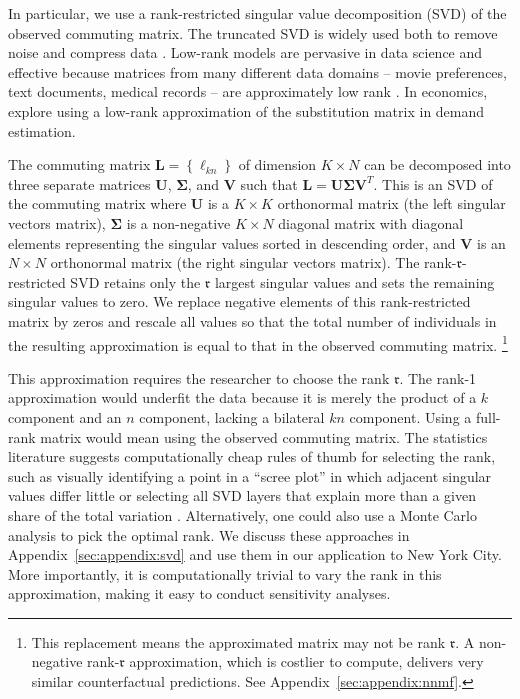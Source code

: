 \documentclass[11pt]{article}
\theoremstyle{definition}
\begin{document}
In particular,
we use a rank-restricted singular value decomposition (SVD) of the observed commuting matrix.
The truncated SVD is widely used both to remove noise and compress data \citep[Ch. 6]{Elden:2007}.
Low-rank models are pervasive in data science and effective because matrices from many different data domains -- movie preferences, text documents, medical records -- are approximately low rank \citep{UdellTownsend:2019}.
In economics, \cite{ConlonMortimerSarkis:2023} explore using a low-rank approximation of the substitution matrix in demand estimation.

The commuting matrix $\mathbf{L}=\left\{\ell_{kn}\right\}$ of dimension $K\times N$ can be decomposed into
three separate matrices $\mathbf{U}$, $\mathbf{\Sigma}$, and $\mathbf{V}$ such that
$\mathbf{L}=\mathbf{U}\mathbf{\Sigma}\mathbf{V}^{T}$.
This is an SVD of the commuting matrix where
	$\mathbf{U}$ is a $K \times K$ orthonormal matrix (the left singular vectors matrix), 
	$\mathbf{\Sigma}$ is a non-negative $K \times N$ diagonal matrix with diagonal elements representing the singular values sorted in descending order,
	and $\mathbf{V}$ is an $N \times N$ orthonormal matrix (the right singular vectors matrix).
The rank-$\mathfrak{r}$-restricted SVD retains only the $\mathfrak{r}$ largest singular values and sets the remaining singular values to zero.
We replace negative elements of this rank-restricted matrix by zeros and rescale all values so that the total number of individuals in the resulting approximation is equal to that in the observed commuting matrix.%
\footnote{%
	This replacement means the approximated matrix may not be rank $\mathfrak{r}$.
	A non-negative rank-$\mathfrak{r}$ approximation, which is costlier to compute, delivers very similar counterfactual predictions.
	See Appendix~\ref{sec:appendix:nnmf}.
}

This approximation requires the researcher to choose the rank $\mathfrak{r}$.
The rank-1 approximation would underfit the data
because it is merely the product of a $k$ component and an $n$ component,
lacking a bilateral $kn$ component.
Using a full-rank matrix would mean using the observed commuting matrix.
The statistics literature suggests computationally cheap rules of thumb for selecting the rank,
such as visually identifying a point in a ``scree plot'' in which adjacent singular values differ little
or
selecting all SVD layers that explain more than a given share of the total variation
\citep[p.496]{Cohen:2021}. Alternatively, one could also use a Monte Carlo analysis to pick the optimal rank.
We discuss these approaches in Appendix~\ref{sec:appendix:svd} and use them in our application to New York City.
More importantly, it is computationally trivial to vary the rank in this approximation,
making it easy to conduct sensitivity analyses.
\end{document}
